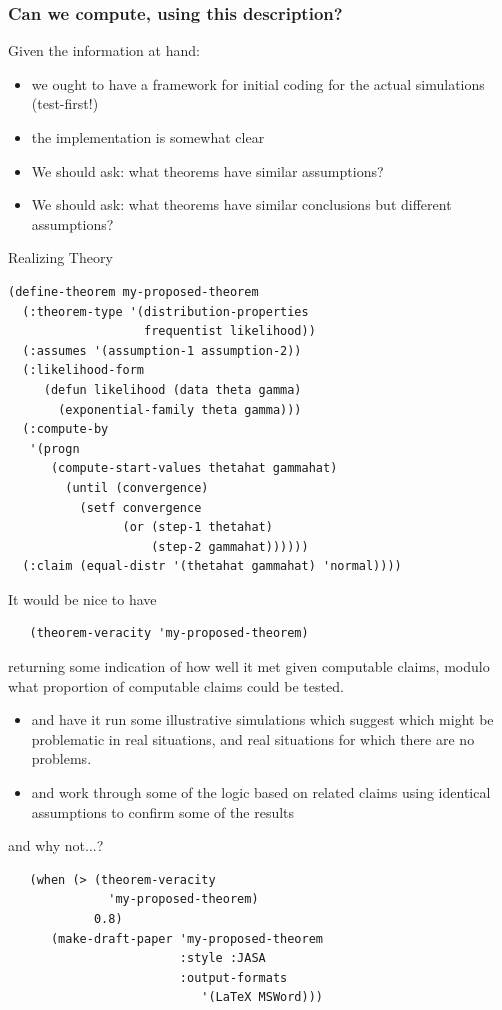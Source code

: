 \documentclass{beamer}
\begin{document}
\begin{frame}
  \frametitle{Can we compute, using this description?}
  Given the information at hand:
  \begin{itemize}
  \item we ought to have a framework for initial coding for the
    actual simulations (test-first!)
  \item the implementation is somewhat clear
  \item We should ask: what theorems have similar assumptions?
  \item We should ask: what theorems have similar conclusions but
    different assumptions?
  \end{itemize}
\end{frame}
\begin{frame}[fragile]{Realizing Theory}
\small{
\begin{verbatim}  
(define-theorem my-proposed-theorem
  (:theorem-type '(distribution-properties
                   frequentist likelihood))
  (:assumes '(assumption-1 assumption-2))
  (:likelihood-form
     (defun likelihood (data theta gamma)
       (exponential-family theta gamma)))
  (:compute-by
   '(progn
      (compute-start-values thetahat gammahat)
        (until (convergence)
          (setf convergence
                (or (step-1 thetahat)
                    (step-2 gammahat))))))
  (:claim (equal-distr '(thetahat gammahat) 'normal))))
\end{verbatim}
}
\end{frame}

\begin{frame}[fragile]{It would be nice to have}
\begin{verbatim}
   (theorem-veracity 'my-proposed-theorem)
\end{verbatim}
returning some indication of how well it met given computable claims,
modulo what proportion of computable claims could be tested.
\begin{itemize}
\item and have it run some illustrative simulations which suggest
  which might be problematic in real situations, and real situations
  for which there are no problems.
\item and work through some of the logic based on related claims using
  identical assumptions to confirm some of the results
\end{itemize}
\end{frame}

\begin{frame}[fragile]{and why not...?}
\begin{verbatim}
   (when (> (theorem-veracity
              'my-proposed-theorem)
            0.8)
      (make-draft-paper 'my-proposed-theorem
                        :style :JASA
                        :output-formats
                           '(LaTeX MSWord)))
\end{verbatim}
\end{frame}
\end{document}
